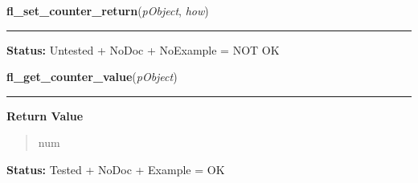     \vspace{0.5ex}

\hspace{.8\funcindent}\begin{boxedminipage}{\funcwidth}

    \raggedright \textbf{fl\_set\_counter\_return}(\textit{pObject}, \textit{how})

    \vspace{-1.5ex}

    \rule{\textwidth}{0.5\fboxrule}
\setlength{\parskip}{2ex}
\setlength{\parskip}{1ex}
\textbf{Status:} Untested + NoDoc + NoExample = NOT OK



    \end{boxedminipage}

    \label{xformslib:library:fl_get_counter_value}

    \vspace{0.5ex}

\hspace{.8\funcindent}\begin{boxedminipage}{\funcwidth}

    \raggedright \textbf{fl\_get\_counter\_value}(\textit{pObject})

    \vspace{-1.5ex}

    \rule{\textwidth}{0.5\fboxrule}
\setlength{\parskip}{2ex}
\setlength{\parskip}{1ex}
      \textbf{Return Value}
    \vspace{-1ex}

      \begin{quote}
      num

      \end{quote}

\textbf{Status:} Tested + NoDoc + Example = OK



    \end{boxedminipage}

    \label{xformslib:library:fl_get_counter_bounds}

    \vspace{0.5ex}

